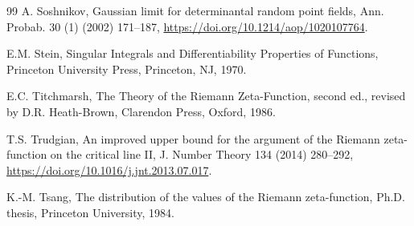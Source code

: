 \documentclass[preprint,12pt]{elsarticle}
\numberwithin{equation}{section}
\theoremstyle{plain}
\theoremstyle{definition}
\theoremstyle{remark}
\begin{document}
\begin{thebibliography}{99}
A. Soshnikov, Gaussian limit for determinantal random point fields, Ann. Probab. 30 (1) (2002) 171--187, \href{https://doi.org/10.1214/aop/1020107764}{https://doi.org/10.1214/aop/1020107764}.

E.M. Stein, Singular Integrals and Differentiability Properties of Functions, Princeton University Press, Princeton, NJ, 1970.

E.C. Titchmarsh, The Theory of the Riemann Zeta-Function, second ed., revised by D.R. Heath-Brown, Clarendon Press, Oxford, 1986.

T.S. Trudgian, An improved upper bound for the argument of the Riemann zeta-function on the critical line II, J. Number Theory 134 (2014) 280--292, \href{https://doi.org/10.1016/j.jnt.2013.07.017}{https://doi.org/10.1016/j.jnt.2013.07.017}.

K.-M. Tsang, The distribution of the values of the Riemann zeta-function, Ph.D. thesis, Princeton University, 1984.

\end{thebibliography}
\end{document}
